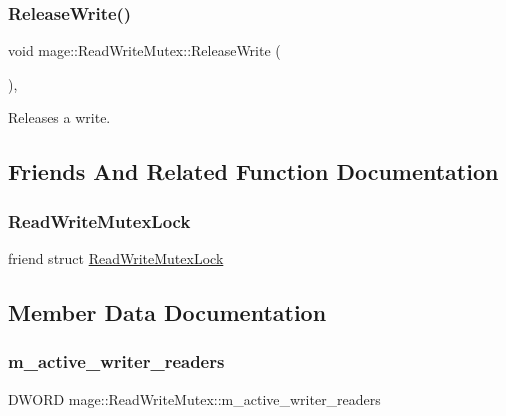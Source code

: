 \subsubsection{\texorpdfstring{Release\+Write()}{ReleaseWrite()}}
{\footnotesize\ttfamily void mage\+::\+Read\+Write\+Mutex\+::\+Release\+Write (\begin{DoxyParamCaption}{ }\end{DoxyParamCaption})\hspace{0.3cm}{\ttfamily [private]}, {\ttfamily [noexcept]}}

Releases a write. 

\subsection{Friends And Related Function Documentation}
\hypertarget{structmage_1_1_read_write_mutex_a7ae207fc659160d3c55a5ba1468007f7}{}\label{structmage_1_1_read_write_mutex_a7ae207fc659160d3c55a5ba1468007f7} 
\subsubsection{\texorpdfstring{Read\+Write\+Mutex\+Lock}{ReadWriteMutexLock}}
{\footnotesize\ttfamily friend struct \hyperlink{structmage_1_1_read_write_mutex_lock}{Read\+Write\+Mutex\+Lock}\hspace{0.3cm}{\ttfamily [friend]}}



\subsection{Member Data Documentation}
\hypertarget{structmage_1_1_read_write_mutex_a1e0ad98e517236170faae5b27decfdce}{}\label{structmage_1_1_read_write_mutex_a1e0ad98e517236170faae5b27decfdce} 
\subsubsection{\texorpdfstring{m\+\_\+active\+\_\+writer\+\_\+readers}{m\_active\_writer\_readers}}
{\footnotesize\ttfamily D\+W\+O\+RD mage\+::\+Read\+Write\+Mutex\+::m\+\_\+active\+\_\+writer\+\_\+readers\hspace{0.3cm}{\ttfamily [private]}}

